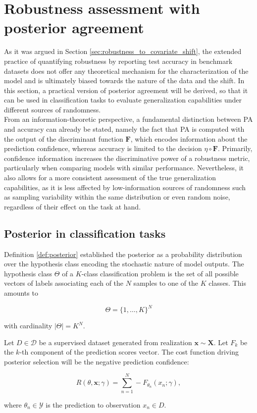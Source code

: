 \section{Robustness assessment with posterior agreement}

As it was argued in Section \ref{sec:robustness_to_covariate_shift}, the extended practice 
of quantifying robustness by reporting test accuracy in benchmark datasets 
does not offer any theoretical mechanism for the characterization of the model 
and is ultimately biased towards the nature of the data and the shift. In this section, a practical 
version of posterior agreement will be derived, so that it can be used in 
classification tasks to evaluate generalization capabilities under different sources of randomness. \\

From an information-theoretic perspective, a fundamental distinction between PA and 
accuracy can already be stated, namely the fact that PA is computed with the output 
of the discriminant function $\mathbf{F}$, which encodes information about the prediction confidence, 
whereas accuracy is limited to the decision $\eta \circ \mathbf{F}$. Primarily, confidence information 
increases the discriminative power of a robustness metric, particularly 
when comparing models with similar performance. Nevertheless, it also allows for a 
more consistent assessment of the true generalization capabilities, as it is less affected by low-information 
sources of randomness such as sampling variability within the same distribution or
even random noise, regardless of their effect on the task at hand. \\

\subsection{Posterior in classification tasks}

Definition \ref{def:posterior} established the posterior as a probability
distribution over the hypothesis class encoding the stochastic nature of
model outputs. The hypothesis class $\Theta$ of a $K$-class classification problem is the set of
all possible vectors of labels associating each of the $N$ samples to one of the $K$ classes. This amounts to

$$
\Theta = \{1, \dots, K \}^N
$$

with cardinality $|\Theta| = K^N$.

\begin{proposition}
    Let $D \in \mathcal{D}$ be a supervised dataset generated from realization $\bm{x} \sim \bm{X}$. Let $F_k$ 
    be the $k$-th component of the prediction scores vector. The cost function driving posterior selection 
    will be the negative prediction confidence:

    $$
    R(\theta, \bm{x}; \gamma) = \sum_{n=1}^N - F_{\theta_n}(x_n; \gamma),
    $$

    where $\theta_n \in \mathcal{Y}$ is the prediction to observation $x_n \in D$.
\end{proposition}

